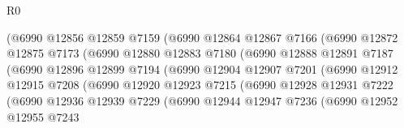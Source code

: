 \begin{lexlean}{R0}
\begin{coremodule}
                              (@6990
                                @12856
                                @12859
                                @7159
                                (@6990
                                  @12864
                                  @12867
                                  @7166
                                  (@6990
                                    @12872
                                    @12875
                                    @7173
                                    (@6990
                                      @12880
                                      @12883
                                      @7180
                                      (@6990
                                        @12888
                                        @12891
                                        @7187
                                        (@6990
                                          @12896
                                          @12899
                                          @7194
                                          (@6990
                                            @12904
                                            @12907
                                            @7201
                                            (@6990
                                              @12912
                                              @12915
                                              @7208
                                              (@6990
                                                @12920
                                                @12923
                                                @7215
                                                (@6990
                                                  @12928
                                                  @12931
                                                  @7222
                                                  (@6990
                                                    @12936
                                                    @12939
                                                    @7229
                                                    (@6990
                                                      @12944
                                                      @12947
                                                      @7236
                                                      (@6990
                                                        @12952
                                                        @12955
                                                        @7243

\end{coremodule}
\end{lexlean}
